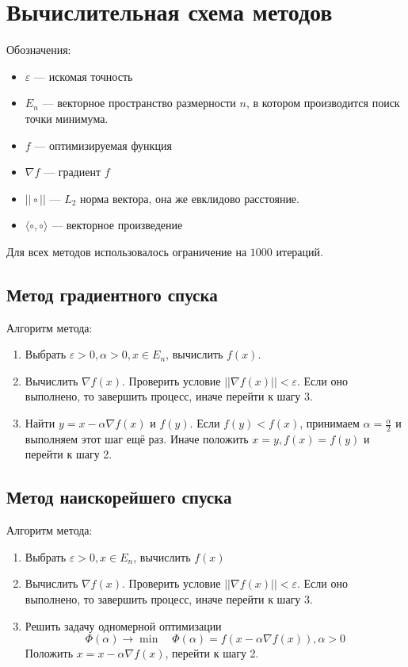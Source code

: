 	\section{Вычислительная схема методов}

	Обозначения:
	\begin{itemize}
		\item \(\varepsilon\) --- искомая точность
		\item \(E_n\) --- векторное пространство размерности \(n\), в котором производится поиск точки минимума.
		\item \(f\) --- оптимизируемая функция
		\item \(\nabla f\) --- градиент \(f\)
		\item \(||\circ||\) --- \(L_2\) норма вектора, она же евклидово расстояние.
		\item \(\langle \circ, \circ \rangle\) --- векторное произведение
	\end{itemize}

	Для всех методов использовалось ограничение на \(1000\) итераций.
	
	\subsection{Метод градиентного спуска}
	
	Алгоритм метода:
	\begin{enumerate}
		\item Выбрать \(\varepsilon > 0, \alpha > 0, x\in E_n\), вычислить \(f(x)\).
		\item Вычислить \(\nabla f(x)\). Проверить условие \(||\nabla f(x)|| < \varepsilon\). Если оно выполнено, то завершить процесс, иначе перейти к шагу 3.
		\item Найти \(y = x - \alpha \nabla f(x)\) и \(f(y)\). Если \(f(y) < f(x)\), принимаем \(\alpha = \frac{\alpha}{2}\) и выполняем этот шаг ещё раз. Иначе положить \(x = y, f(x) = f(y)\) и перейти к шагу 2.
	\end{enumerate}
	
	\subsection{Метод наискорейшего спуска}
	
	Алгоритм метода:
	\begin{enumerate}
		\item Выбрать \(\varepsilon > 0, x \in E_n\), вычислить \(f(x)\)
		\item Вычислить \(\nabla f(x)\). Проверить условие \(||\nabla f(x)|| < \varepsilon\). Если оно выполнено, то завершить процесс, иначе перейти к шагу 3.
		\item Решить задачу одномерной оптимизации
		\[\Phi(\alpha) \to \min \quad \Phi(\alpha) = f(x - \alpha \nabla f(x)), \alpha > 0\]
		Положить \(x = x - \alpha \nabla f(x)\), перейти к шагу 2.
	\end{enumerate}
	
